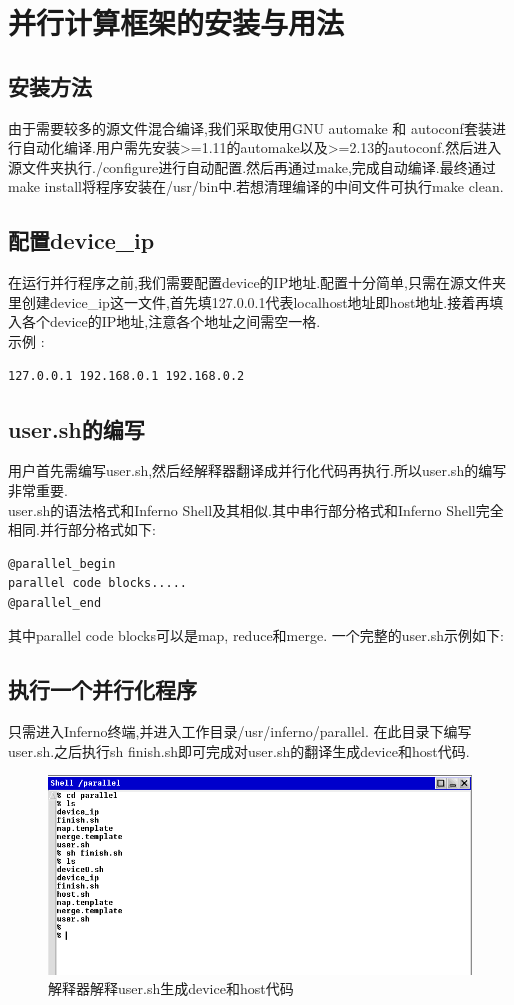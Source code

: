\documentclass[paper=a4]{ctexart} %
\numberwithin{equation}{section} %
\numberwithin{figure}{section} %
\numberwithin{table}{section} %
\newcommand{\n}{\\\indent}
\begin{document}
\section{并行计算框架的安装与用法}

\subsection{安装方法}
由于需要较多的源文件混合编译,我们采取使用GNU automake 和 autoconf套装进行自动化编译.用户需先安装>=1.11的automake以及>=2.13的autoconf.然后进入源文件夹执行./configure进行自动配置.然后再通过make,完成自动编译.最终通过make install将程序安装在/usr/bin中.若想清理编译的中间文件可执行make clean.

\subsection{配置device\_ip}
在运行并行程序之前,我们需要配置device的IP地址.配置十分简单,只需在源文件夹里创建device\_ip这一文件,首先填127.0.0.1代表localhost地址即host地址.接着再填入各个device的IP地址,注意各个地址之间需空一格.\n
示例 : 
\begin{lstlisting}
127.0.0.1 192.168.0.1 192.168.0.2
\end{lstlisting}

\subsection{user.sh的编写}
用户首先需编写user.sh,然后经解释器翻译成并行化代码再执行.所以user.sh的编写非常重要.\n
user.sh的语法格式和Inferno Shell及其相似.其中串行部分格式和Inferno Shell完全相同.并行部分格式如下:\n
\begin{lstlisting}
@parallel_begin
parallel code blocks.....
@parallel_end
\end{lstlisting}
其中parallel code blocks可以是map, reduce和merge.
一个完整的user.sh示例如下:



\subsection{执行一个并行化程序}
只需进入Inferno终端,并进入工作目录/usr/inferno/parallel. 在此目录下编写user.sh.之后执行sh finish.sh即可完成对user.sh的翻译生成device和host代码. 

    \begin{figure}[htbp]
      \centering
      \includegraphics[width=\textwidth]{pic/inferno_interpreter.png}
      \caption{解释器解释user.sh生成device和host代码}
    \end{figure}
\end{document}
